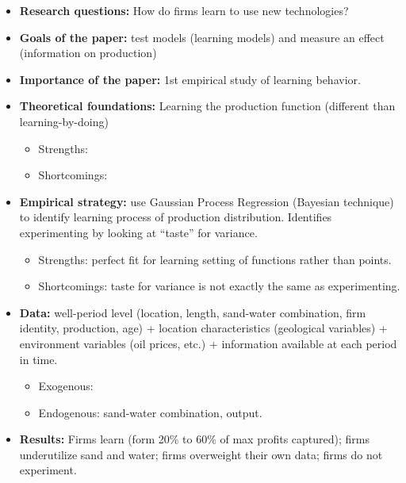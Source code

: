 \begin{itemize}
\item \textbf{Research questions:} How do firms learn to use new technologies?
\item \textbf{Goals of the paper:} test models (learning models) and measure an effect (information on production)
\item \textbf{Importance of the paper:} 1st empirical study of learning behavior.
\item \textbf{Theoretical foundations:} Learning the production function (different than learning-by-doing) \begin{itemize}
\item Strengths: 
\item Shortcomings: 
\end{itemize}
\item \textbf{Empirical strategy:} use Gaussian Process Regression (Bayesian technique) to identify learning process of production distribution. Identifies experimenting by looking at ``taste'' for variance. \begin{itemize}
\item Strengths: perfect fit for learning setting of functions rather than points.
\item Shortcomings: taste for variance is not exactly the same as experimenting.
\end{itemize}
\item \textbf{Data:} well-period level (location, length, sand-water combination, firm identity, production, age) + location characteristics (geological variables) + environment variables (oil prices, etc.) + information available at each period in time.
\begin{itemize}
\item Exogenous:
\item Endogenous: sand-water combination, output.
\end{itemize}
\item \textbf{Results:} Firms learn (form 20\% to 60\% of max profits captured); firms underutilize sand and water; firms overweight their own data; firms do not experiment.
\end{itemize}